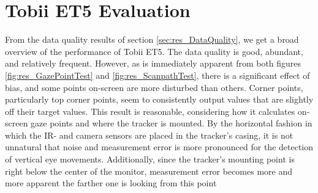 \section{Tobii ET5 Evaluation} \label{sec:disc_TobiiET5Evaluation}


From the data quality results of section \ref{sec:res_DataQuality}, we get a broad overview of the performance of Tobii ET5. The data quality is good, abundant, and relatively frequent. However, as is immediately apparent from both figures \ref{fig:res_GazePointTest} and \ref{fig:res_ScanpathTest}, there is a significant effect of bias, and some points on-screen are more disturbed than others. Corner points, particularly top corner points, seem to consistently output values that are slightly off their target values. This result is reasonable, considering how it calculates on-screen gaze points and where the tracker is mounted. By the horizontal fashion in which the IR- and camera sensors are placed in the tracker's casing, it is not unnatural that noise and measurement error is more pronounced for the detection of vertical eye movements. Additionally, since the tracker's mounting point is right below the center of the monitor, measurement error becomes more and more apparent the farther one is looking from this point

